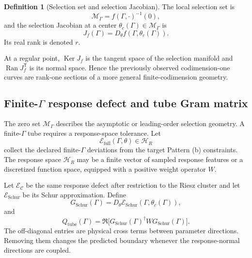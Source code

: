 \documentclass[11pt]{article}
\theoremstyle{definition}
\newtheorem{definition}[theorem]{Definition}
\theoremstyle{remark}
\DeclareMathOperator{\Ran}{Ran}
\DeclareMathOperator{\Ker}{Ker}
\newcommand{\cC}{\mathcal C}
\newcommand{\cM}{\mathcal M}
\newcommand{\cH}{\mathcal H}
\newcommand{\cE}{\mathcal E}
\begin{document}
\begin{definition}[Selection set and selection Jacobian]\label{def:selection-manifold}
The local selection set is
\begin{equation}
\cM_\Gamma=f(\Gamma,\cdot)^{-1}(0),
\label{eq:selection-manifold}
\end{equation}
and the selection Jacobian at a center $\theta_c(\Gamma)\in\cM_\Gamma$ is
\begin{equation}
J_f(\Gamma)=D_\theta f(\Gamma,\theta_c(\Gamma)).
\label{eq:selection-jacobian}
\end{equation}
Its real rank is denoted $r$.
\end{definition}

At a regular point, $\Ker J_f$ is the tangent space of the selection manifold and $\Ran J_f^{\mathsf T}$ is its normal space. Hence the previously observed codimension-one curves are rank-one sections of a more general finite-codimension geometry.

\subsection{Finite-\texorpdfstring{$\Gamma$}{Gamma} response defect and tube Gram matrix}

The zero set $\cM_\Gamma$ describes the asymptotic or leading-order selection geometry. A finite-$\Gamma$ tube requires a response-space tolerance. Let
\begin{equation}
\cE_{\mathrm{full}}(\Gamma,\theta)
\in\cH_R
\label{eq:response-defect}
\end{equation}
collect the declared finite-$\Gamma$ deviations from the target Pattern (b) constraints. The response space $\cH_R$ may be a finite vector of sampled response features or a discretized function space, equipped with a positive weight operator $W$.

Let $\cE_{\cC}$ be the same response defect after restriction to the Riesz cluster and let $\cE_{\mathrm{Schur}}$ be its Schur approximation. Define
\begin{equation}
G_{\mathrm{Schur}}(\Gamma)
=D_\theta\cE_{\mathrm{Schur}}
(\Gamma,\theta_c(\Gamma)),
\label{eq:schur-response-derivative}
\end{equation}
and
\begin{equation}
\boxed{
Q_{\mathrm{tube}}(\Gamma)
=
\Re\!\bigl[
G_{\mathrm{Schur}}(\Gamma)^\dagger
W
G_{\mathrm{Schur}}(\Gamma)
\bigr].
}
\label{eq:tube-gram}
\end{equation}
The off-diagonal entries are physical cross terms between parameter directions. Removing them changes the predicted boundary whenever the response-normal directions are coupled.
\end{document}
